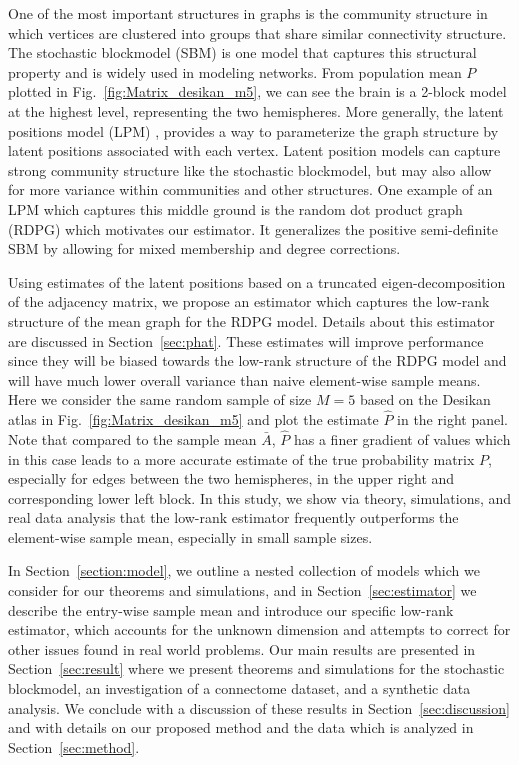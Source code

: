 \documentclass[10pt,letterpaper]{article}
\renewcommand{\hat}{\widehat}
\begin{document}
One of the most important structures in graphs is the community structure in which vertices are clustered into groups that share similar connectivity structure. The stochastic blockmodel (SBM) \citep{holland1983stochastic} is one model that captures this structural property and is widely used in modeling networks. From population mean $P$ plotted in Fig.~\ref{fig:Matrix_desikan_m5}, we can see the brain is a 2-block model at the highest level, representing the two hemispheres.
More generally, the latent positions model (LPM) \citep{hoff2002latent}, provides a way to parameterize the graph structure by latent positions associated with each vertex. 
Latent position models can capture strong community structure like the stochastic blockmodel, but may also allow for more variance within communities and other structures.
One example of an LPM which captures this middle ground is the random dot product graph (RDPG) \citep{young2007random, nickel2007random} which motivates our estimator. It generalizes the positive semi-definite SBM by allowing for mixed membership and degree corrections.

Using estimates of the latent positions based on a truncated eigen-decomposition of the adjacency matrix, we propose an estimator which captures the low-rank structure of the mean graph for the RDPG model. Details about this estimator are discussed in Section~\ref{sec:phat}.
These estimates will improve performance since they will be biased towards the low-rank structure of the RDPG model and will have much lower overall variance than naive element-wise sample means. Here we consider the same random sample of size $M=5$ based on the Desikan atlas in Fig.~\ref{fig:Matrix_desikan_m5} and plot the estimate $\hat{P}$ in the right panel. Note that compared to the sample mean $\bar{A}$, $\hat{P}$ has a finer gradient of values which in this case leads to a more accurate estimate of the true probability matrix $P$, especially for edges between the two hemispheres, in the upper right and corresponding lower left block.
In this study, we show via theory, simulations, and real data analysis that the low-rank estimator frequently outperforms the element-wise sample mean, especially in small sample sizes.


In Section~\ref{section:model}, we outline a nested collection of models which we consider for our theorems and simulations, and in Section~\ref{sec:estimator} we describe the entry-wise sample mean and introduce our specific low-rank estimator, which accounts for the unknown dimension and attempts to correct for other issues found in real world problems.
Our main results are presented in Section~\ref{sec:result} where we present theorems and simulations for the stochastic blockmodel, an investigation of a connectome dataset, and a synthetic data analysis. 
We conclude with a discussion of these results in Section~\ref{sec:discussion}  and with details on our proposed method and the data which is analyzed in Section~\ref{sec:method}.
\end{document}
